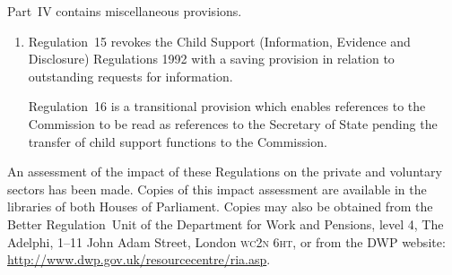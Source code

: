 \documentclass[12pt,a4paper]{article}
\begin{document}
Part~IV contains miscellaneous provisions.
\begin{enumerate}\item[]
Regulation~15 revokes the Child Support (Information, Evidence and Disclosure) Regulations 1992 with a saving provision in relation to outstanding requests for information.

Regulation~16 is a transitional provision which enables references to the Commission to be read as references to the Secretary of State pending the transfer of child support functions to the Commission.
\end{enumerate}

An assessment of the impact of these Regulations on the private and voluntary sectors has been made. Copies of this impact assessment are available in the libraries of both Houses of Parliament. Copies may also be obtained from the Better Regulation~Unit of the Department for Work and Pensions, level 4, The Adelphi, 1--11 John Adam Street, London \textsc{\lowercase{WC2N 6HT}}, or from the DWP website: \url{http://www.dwp.gov.uk/resourcecentre/ria.asp}. 
\end{document}
